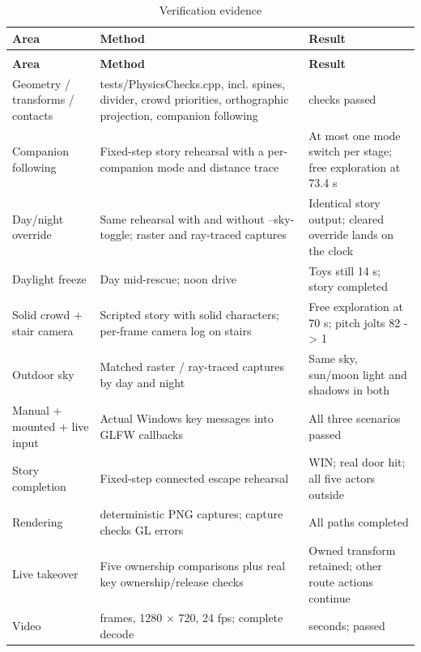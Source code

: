 \documentclass[12pt,a4paper]{article}
\begin{document}
{\small\setlength{\tabcolsep}{4pt}\renewcommand{\arraystretch}{1.12}
\begin{longtable}{>{\raggedright\arraybackslash}p{}>{\raggedright\arraybackslash}p{}>{\raggedright\arraybackslash}p{}}
\caption{Verification evidence}\label{tab:10}\\
\toprule
\textbf{Area} & \textbf{Method} & \textbf{Result} \\\midrule
\endfirsthead
\multicolumn{3}{l}{\small\itshape Table \thetable{} (continued)}\\
\toprule
\textbf{Area} & \textbf{Method} & \textbf{Result} \\\midrule
\endhead
\bottomrule\endfoot
Geometry / transforms / contacts & tests/PhysicsChecks.cpp, incl. spines, divider, crowd priorities, orthographic projection, companion following & 92 checks passed \\
Companion following & Fixed-step story rehearsal with a per-companion mode and distance trace & At most one mode switch per stage; free exploration at 73.4 s \\
Day/night override & Same rehearsal with and without --sky-toggle; raster and ray-traced captures & Identical story output; cleared override lands on the clock \\
Daylight freeze & Day mid-rescue; noon drive & Toys still 14 s; story completed \\
Solid crowd + stair camera & Scripted story with solid characters; per-frame camera log on stairs & Free exploration at 70 s; pitch jolts 82 -> 1 \\
Outdoor sky & Matched raster / ray-traced captures by day and night & Same sky, sun/moon light and shadows in both \\
Manual + mounted + live input & Actual Windows key messages into GLFW callbacks & All three scenarios passed \\
Story completion & Fixed-step connected escape rehearsal & WIN; real door hit; all five actors outside \\
Rendering & 55 deterministic PNG captures; capture checks GL errors & All paths completed \\
Live takeover & Five ownership comparisons plus real key ownership/release checks & Owned transform retained; other route actions continue \\
Video & 2880 frames, 1280 \(\times\) 720, 24 fps; complete decode & 120 seconds; passed \\
\end{longtable}
}
\end{document}
